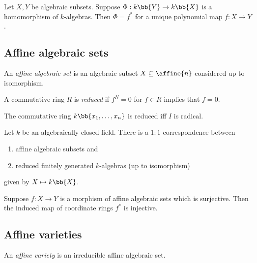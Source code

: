 \documentclass{article}
\begin{document}
\begin{lemma}
  Let $X,Y$ be algebraic subsets. Suppose $\Phi : k\bb{Y}\to k\bb{X}$ is a homomorphism
  of $k$-algebras. Then $\Phi=f^*$ for a unique polynomial map $f:X\to Y$.
\end{lemma}

\subsection{Affine algebraic sets}

\begin{definition}
  An \emph{affine algebraic set} is an algebraic subset $X\subseteq\affine{n}$ considered
  up to isomorphism.
\end{definition}

\begin{definition}
  A commutative ring $R$ is \emph{reduced} if $f^N=0$ for $f\in R$ implies that $f=0$.
\end{definition}

\begin{lemma}
  The commutative ring $k\bb{x_1,\ldots,x_n}$ is reduced iff $I$ is radical.
\end{lemma}

\begin{theorem}
  Let $k$ be an algebraically closed field. There is a $1:1$ correspondence
  between
  \begin{enumerate}
    \item affine algebraic subsets and
    \item reduced finitely generated $k$-algebras (up to isomorphism)
  \end{enumerate}
  given by $X\mapsto k\bb{X}$.
\end{theorem}

\begin{proposition}
  Suppose $f:X\to Y$ is a morphism of affine algebraic sets which is surjective. Then
  the induced map of coordinate rings $f^*$ is injective.
\end{proposition}

\subsection{Affine varieties}

\begin{definition}
  An \emph{affine variety} is an irreducible affine algebraic set.
\end{definition}
\end{document}

